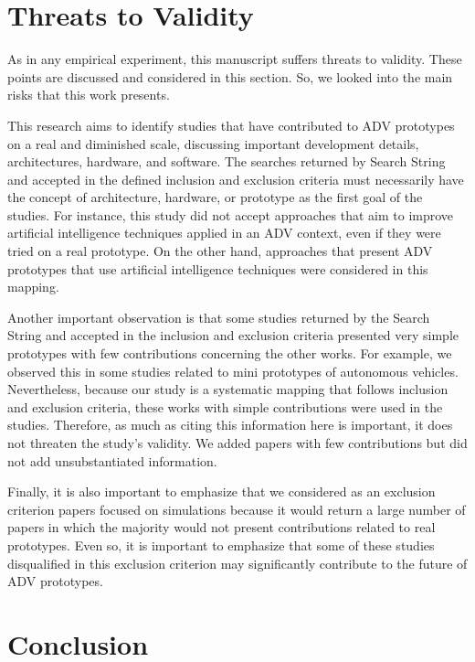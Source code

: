 \documentclass[lettersize,journal]{IEEEtran}
\begin{document}
\color{black}

\section{Threats to Validity}

As in any empirical experiment, this manuscript suffers threats to validity. These points are discussed and considered in this section. So, we looked into the main risks that this work presents.

This research aims to identify studies that have contributed to  ADV prototypes on a real and diminished scale, discussing important development details, architectures, hardware, and software. The searches returned by Search String and accepted in the defined inclusion and exclusion criteria must necessarily have the concept of architecture, hardware, or prototype as the first goal of the studies. For instance, this study did not accept approaches that aim to improve artificial intelligence techniques applied in an ADV context, even if they were tried on a real prototype. On the other hand, approaches that present ADV prototypes that use artificial intelligence techniques were considered in this mapping.

Another important observation is that some studies returned by the Search String and accepted in the inclusion and exclusion criteria presented very simple prototypes with few contributions concerning the other works. For example, we observed this in some studies related to mini prototypes of autonomous vehicles. Nevertheless, because our study is a systematic mapping that follows inclusion and exclusion criteria, these works with simple contributions were used in the studies. Therefore, as much as citing this information here is important, it does not threaten the study's validity. We added papers with few contributions but did not add unsubstantiated information.

Finally, it is also important to emphasize that we considered as an exclusion criterion papers focused on simulations because it would return a large number of papers in which the majority would not present contributions related to real prototypes. Even so, it is important to emphasize that some of these studies disqualified in this exclusion criterion may significantly contribute to the future of ADV prototypes.

\color{black}
\section{Conclusion}\label{conclusao}
\end{document}
